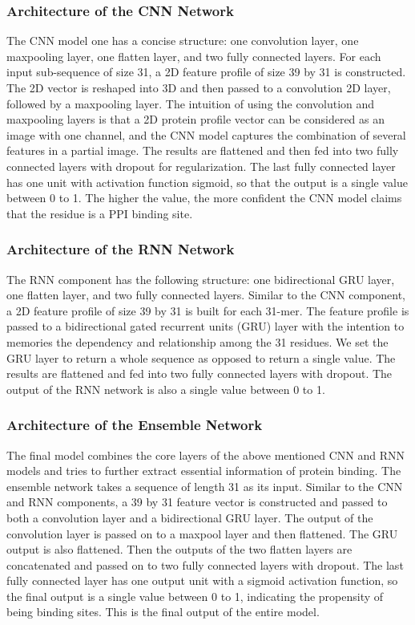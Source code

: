 \subsubsection{Architecture of the CNN Network}
The CNN model one has a concise structure: one convolution layer, one maxpooling layer, one flatten layer, and two fully connected layers. For each input sub-sequence of size 31, a 2D feature profile of size 39 by 31 is constructed. The 2D vector is reshaped into 3D and then passed to a convolution 2D layer, followed by a maxpooling layer. The intuition of using the convolution and maxpooling layers is that a 2D protein profile vector can be considered as an image with one channel, and the CNN model captures the combination of several features in a partial image. The results are flattened and then fed into two fully connected layers with dropout for regularization. The last fully connected layer has one unit with activation function sigmoid, so that the output is a single value between 0 to 1. The higher the value, the more confident the CNN model claims that the residue is a PPI binding site.
\subsubsection{Architecture of the RNN Network}
The RNN component has the following structure: one bidirectional GRU layer, one flatten layer, and two fully connected layers. Similar to the CNN component, a 2D feature profile of size 39 by 31 is built for each 31-mer. The feature profile is passed to a bidirectional gated recurrent units (GRU) layer with the intention to memories the dependency and relationship among the 31 residues. We set the GRU layer to return a whole sequence as opposed to return a single value. The results are flattened and fed into two fully connected layers with dropout. The output of the RNN network is also a single value between 0 to 1.
\subsubsection{Architecture of the Ensemble Network \label{section_ensemble}}
The final model combines the core layers of the above mentioned CNN and RNN models and tries to further extract essential information of protein binding. The ensemble network takes a sequence of length 31 as its input. Similar to the CNN and RNN components, a 39 by 31 feature vector is constructed and passed to both a convolution layer and a bidirectional GRU layer. The output of the convolution layer is passed on to a maxpool layer and then flattened. The GRU output is also flattened. Then the outputs of the two flatten layers are concatenated and passed on to two fully connected layers with dropout. The last fully connected layer has one output unit with a sigmoid activation function, so the final output is a single value between 0 to 1, indicating the propensity of being binding sites. This is the final output of the entire model. 

